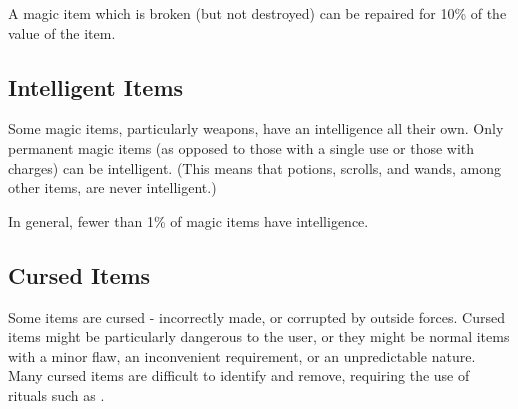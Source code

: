         A magic item which is broken (but not destroyed) can be repaired for 10\% of the value of the item.

    \subsection{Intelligent Items}

        Some magic items, particularly weapons, have an intelligence all their own.
        Only permanent magic items (as opposed to those with a single use or those with charges) can be intelligent.
        (This means that potions, scrolls, and wands, among other items, are never intelligent.)

        In general, fewer than 1\% of magic items have intelligence.

    \subsection{Cursed Items}

        Some items are cursed - incorrectly made, or corrupted by outside forces.
        Cursed items might be particularly dangerous to the user, or they might be normal items with a minor flaw, an inconvenient requirement, or an unpredictable nature.
        Many cursed items are difficult to identify and remove, requiring the use of rituals such as .
